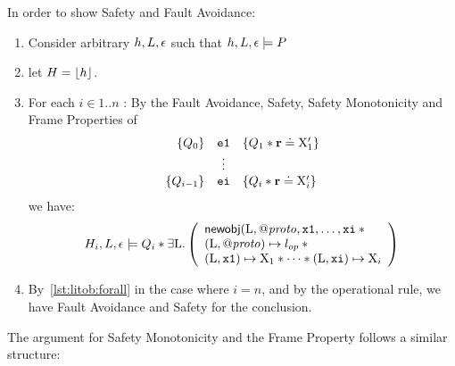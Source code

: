 \documentclass{article}
\begin{document}
In order to show Safety and Fault Avoidance:
\begin{enumerate}
        \item Consider arbitrary $h,L,\epsilon$ such that $h,L,\epsilon \models P$
        \item let $H = \lfloor h\rfloor$.
        \item \label{lst:litob:forall} For each $i \in 1..n$ :
                By the Fault Avoidance, Safety, Safety Monotonicity and Frame Properties of 
                \[ \begin{array}{rcl}
                        \{Q_{0}\}&{\mbox{\texttt{{\upshape e1}}}}&\{Q_1 \mathbin{*} {\mathrm{\textbf{r}}} \doteq {\ensuremath{\mathrm{X}}}_1'\}\\
                        &\vdots&\\
                        \{Q_{i-1}\}&{\mbox{\texttt{{\upshape ei}}}}&\{Q_i \mathbin{*} {\mathrm{\textbf{r}}} \doteq {\ensuremath{\mathrm{X}}}_i'\}
                \end{array}\] 
                we have:
                \[
                H_i,L,\env \satisfies Q_i \sep \exists\V{L}\st \left(
                \begin{array}{l}
                        \newobj(\V{L},\protop,\js{x1},\dots,\js{xi} \sep {}\\
                        (\V{L},\protop)\pointsto \lop \sep {} \\
                        (\V{L},\js{x1})\pointsto\V{X}_1 \sep \dots \sep (\V{L},\js{xi})\pointsto\V{X}_i
                \end{array}
                \right)
                \]
        \item By~\ref{lst:litob:forall} in the case where $i=n$, and by the operational rule, we have Fault Avoidance and Safety for the conclusion.
\end{enumerate}

The argument for Safety Monotonicity and the Frame Property follows a similar structure:
\end{document}
